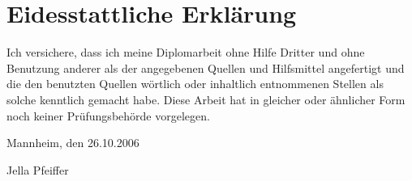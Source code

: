 \chapter*{Eidesstattliche Erkl\"{a}rung}
\thispagestyle{empty}
Ich versichere, dass ich meine Diplomarbeit ohne Hilfe Dritter und ohne Benutzung
anderer als der angegebenen Quellen und Hilfsmittel angefertigt und die den benutzten
Quellen w\"{o}rtlich oder inhaltlich entnommenen Stellen als solche kenntlich gemacht habe.
Diese Arbeit hat in gleicher oder \"{a}hnlicher Form noch keiner Pr\"{u}fungsbeh\"{o}rde
vorgelegen.
\bigskip

\raggedright{Mannheim, den 26.10.2006} \bigskip \bigskip \bigskip

Jella Pfeiffer

